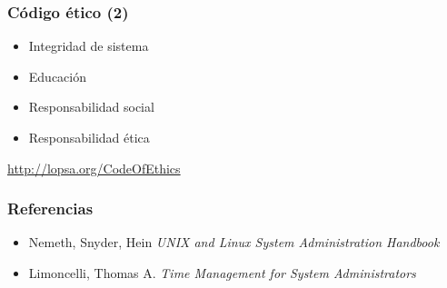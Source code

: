 \documentclass{beamer}
\begin{document}

\begin{frame}
\frametitle{Código ético (2)}

\begin{itemize}
\item Integridad de sistema
\item Educación
\item Responsabilidad social
\item Responsabilidad ética
\end{itemize}

\url{http://lopsa.org/CodeOfEthics}

\end{frame}


\begin{frame}
\frametitle{Referencias}

\begin{itemize}
\item Nemeth, Snyder, Hein \textit{UNIX and Linux System Administration Handbook}
\item Limoncelli, Thomas A. \textit{Time Management for System Administrators} 
\end{itemize}

\end{frame}
\end{document}

